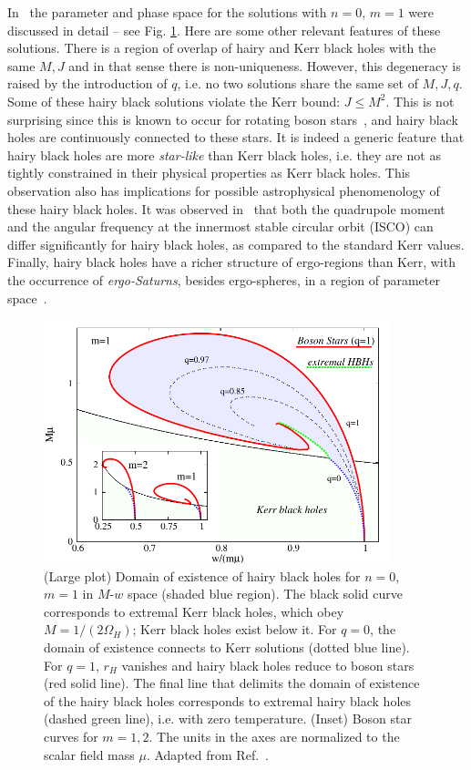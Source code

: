 In~\cite{Herdeiro:2014goa} the parameter and phase space for the solutions with $n=0$, $m=1$ were discussed in detail -- see Fig. \ref{fig:HBH-parameter-space}.
Here are some other relevant features of these solutions.
There is a region of overlap of hairy and Kerr black holes with the same $M,J$ and in that sense there is non-uniqueness.
However, this degeneracy is raised by the introduction of $q$, i.e. no two solutions share the same set of $M,J,q$.
Some of these hairy black solutions violate the Kerr bound: $J\le M^2$.
This is not surprising since this is known to occur for rotating boson stars~\cite{Ryan:1996nk}, and hairy black holes are continuously connected to these stars.
It is indeed a generic feature that hairy black holes are more \textit{star-like} than Kerr black holes, i.e. they are not as tightly constrained in their physical properties as Kerr black holes.
This observation also has implications for possible astrophysical phenomenology of these hairy black holes.
It was observed in~\cite{Herdeiro:2014goa} that both the quadrupole moment and the angular frequency at the innermost stable circular orbit (ISCO) can differ significantly for hairy black holes, as compared to the standard Kerr values.
Finally, hairy black holes have a richer structure of ergo-regions than Kerr, with the occurrence of \textit{ergo-Saturns}, besides ergo-spheres, in a region of parameter space~\cite{Herdeiro:2014jaa}.

\begin{figure}[H]
  \begin{center}
  \includegraphics[height=2.78in]{Figs/BH-w-M.pdf}
  \end{center}
  \caption{(Large plot) Domain of existence of hairy black holes for $n=0$, $m=1$ in $M$-$w$ space (shaded blue region). The black solid curve corresponds to extremal Kerr black holes, which obey $M={1}/(2\Omega_H)$; Kerr black holes exist below it. For $q=0$, the domain of existence connects to Kerr solutions (dotted blue line). For $q=1$, $r_H$ vanishes and hairy black holes reduce to boson stars (red solid line). The final line that delimits the domain of existence of the hairy black holes corresponds to extremal hairy black holes (dashed green line), i.e. with zero temperature. (Inset) Boson star curves for $m=1,2$. The units in the axes are normalized to the scalar field mass $\mu$. Adapted from Ref.~\cite{Herdeiro:2014goa}.}
  \label{fig:HBH-parameter-space}
\end{figure}

